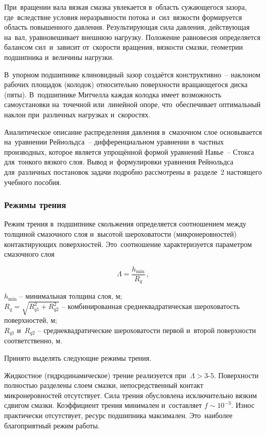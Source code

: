 При~вращении вала вязкая смазка увлекается в~область сужающегося зазора, где~вследствие условия неразрывности потока и~сил~вязкости формируется область повышенного давления. Результирующая сила давления, действующая на~вал, уравновешивает внешнюю нагрузку. Положение равновесия определяется балансом сил~и~зависит от~скорости вращения, вязкости смазки, геометрии подшипника и~величины нагрузки.

В~упорном подшипнике клиновидный зазор создаётся конструктивно~-- наклоном рабочих площадок (колодок) относительно поверхности вращающегося диска (пяты). В~подшипнике Митчелла каждая колодка имеет возможность самоустановки на~точечной или~линейной опоре, что~обеспечивает оптимальный наклон при~различных нагрузках и~скоростях.

Аналитическое описание распределения давления в~смазочном слое основывается на~уравнении Рейнольдса~-- дифференциальном уравнении в~частных производных, которое является упрощённой формой уравнений Навье~-- Стокса для~тонкого вязкого слоя. Вывод и~формулировки уравнения Рейнольдса для~различных постановок задачи подробно рассмотрены в~разделе~2 настоящего учебного пособия.

\subsubsection{Режимы трения}

Режим трения в~подшипнике скольжения определяется соотношением между толщиной смазочного слоя и~высотой шероховатости (микронеровностей) контактирующих поверхностей. Это~соотношение характеризуется параметром смазочного слоя

\begin{equation}
\Lambda = \frac{h_{\min}}{R_q}\,,
\end{equation}
\begin{conditions}
$h_{\min}$ -- минимальная толщина слоя, м;\\
$R_q = \sqrt{R_{q1}^2 + R_{q2}^2}$ -- комбинированная среднеквадратическая шероховатость поверхностей, м;\\
$R_{q1}$ и~$R_{q2}$ -- среднеквадратические шероховатости первой и~второй поверхности соответственно, м.
\end{conditions}
Принято выделять следующие режимы трения.

Жидкостное (гидродинамическое) трение реализуется при~$\Lambda > 3\text{-}5$. Поверхности полностью разделены слоем смазки, непосредственный контакт микронеровностей отсутствует. Сила трения обусловлена исключительно вязким сдвигом смазки. Коэффициент трения минимален и~составляет $f \sim 10^{-3}$. Износ практически отсутствует, ресурс подшипника максимален. Это~наиболее благоприятный режим работы.

